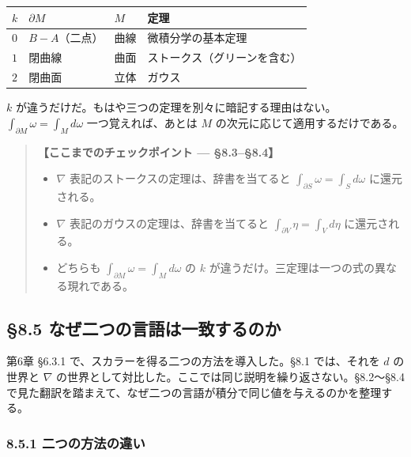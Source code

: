 \documentclass[a4paper,12pt,openany]{book}
\begin{document}
\begin{longtable}[]{@{}llll@{}}
\toprule\noalign{}
\(k\) & \(\partial M\) & \(M\) & 定理 \\
\midrule\noalign{}
\endhead
\bottomrule\noalign{}
\endlastfoot
\(0\) & \(B-A\)（二点） & 曲線 & 微積分学の基本定理 \\
\(1\) & 閉曲線 & 曲面 & ストークス（グリーンを含む） \\
\(2\) & 閉曲面 & 立体 & ガウス \\
\end{longtable}

\(k\)
が違うだけだ。もはや三つの定理を別々に暗記する理由はない。\(\int_{\partial M}\omega = \int_M d\omega\)
一つ覚えれば、あとは \(M\) の次元に応じて適用するだけである。

\begin{quote}
\textbf{【ここまでのチェックポイント — §8.3–§8.4】}

\begin{itemize}
\item
  \(\nabla\) 表記のストークスの定理は、辞書を当てると
  \(\int_{\partial S}\omega = \int_S d\omega\) に還元される。
\item
  \(\nabla\) 表記のガウスの定理は、辞書を当てると
  \(\int_{\partial V}\eta = \int_V d\eta\) に還元される。
\item
  どちらも \(\int_{\partial M}\omega = \int_M d\omega\) の \(k\)
  が違うだけ。三定理は一つの式の異なる現れである。
\end{itemize}
\end{quote}

\par\vspace{0.35em}\par

\hypertarget{ux306aux305cux4e8cux3064ux306eux8a00ux8a9eux306fux4e00ux81f4ux3059ux308bux306eux304b}{%
\subsection{§8.5
なぜ二つの言語は一致するのか}\label{ux306aux305cux4e8cux3064ux306eux8a00ux8a9eux306fux4e00ux81f4ux3059ux308bux306eux304b}}

第6章 §6.3.1 で、スカラーを得る二つの方法を導入した。§8.1 では、それを
\(d\) の世界と \(\nabla\)
の世界として対比した。ここでは同じ説明を繰り返さない。§8.2〜§8.4
で見た翻訳を踏まえて、なぜ二つの言語が積分で同じ値を与えるのかを整理する。

\hypertarget{ux4e8cux3064ux306eux65b9ux6cd5ux306eux9055ux3044}{%
\subsubsection{8.5.1
二つの方法の違い}\label{ux4e8cux3064ux306eux65b9ux6cd5ux306eux9055ux3044}}
\end{document}
